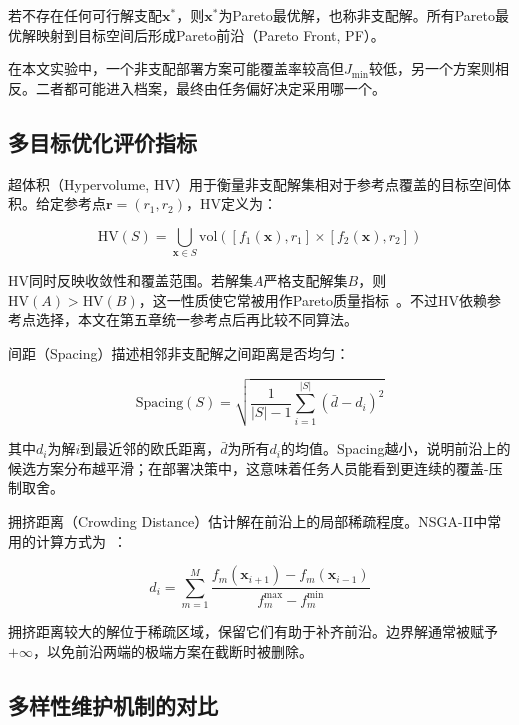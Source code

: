 \begin{definition}[Pareto最优解]
若不存在任何可行解支配$\mathbf{x}^*$，则$\mathbf{x}^*$为Pareto最优解，也称非支配解。所有Pareto最优解映射到目标空间后形成Pareto前沿（Pareto Front, PF）。
\end{definition}

在本文实验中，一个非支配部署方案可能覆盖率较高但$J_{\min}$较低，另一个方案则相反。二者都可能进入档案，最终由任务偏好决定采用哪一个。

\subsection{多目标优化评价指标}

超体积（Hypervolume, HV）用于衡量非支配解集相对于参考点覆盖的目标空间体积。给定参考点$\mathbf{r} = (r_1, r_2)$，HV定义为：

\begin{equation}
\text{HV}(S) = \bigcup_{\mathbf{x} \in S} \text{vol}\left([f_1(\mathbf{x}), r_1] \times [f_2(\mathbf{x}), r_2]\right)
\label{eq:hv}
\end{equation}

HV同时反映收敛性和覆盖范围。若解集$A$严格支配解集$B$，则$\text{HV}(A) > \text{HV}(B)$，这一性质使它常被用作Pareto质量指标~\cite{Zitzler2001}。不过HV依赖参考点选择，本文在第五章统一参考点后再比较不同算法。

间距（Spacing）描述相邻非支配解之间距离是否均匀：

\begin{equation}
\text{Spacing}(S) = \sqrt{\frac{1}{|S|-1} \sum_{i=1}^{|S|} (\bar{d} - d_i)^2}
\label{eq:spacing}
\end{equation}

其中$d_i$为解$i$到最近邻的欧氏距离，$\bar{d}$为所有$d_i$的均值。Spacing越小，说明前沿上的候选方案分布越平滑；在部署决策中，这意味着任务人员能看到更连续的覆盖-压制取舍。

拥挤距离（Crowding Distance）估计解在前沿上的局部稀疏程度。NSGA-II中常用的计算方式为~\cite{Deb2002}：

\begin{equation}
d_i = \sum_{m=1}^{M} \frac{f_m(\mathbf{x}_{i+1}) - f_m(\mathbf{x}_{i-1})}{f_m^{\max} - f_m^{\min}}
\label{eq:crowding}
\end{equation}

拥挤距离较大的解位于稀疏区域，保留它们有助于补齐前沿。边界解通常被赋予$+\infty$，以免前沿两端的极端方案在截断时被删除。

\subsection{多样性维护机制的对比}

